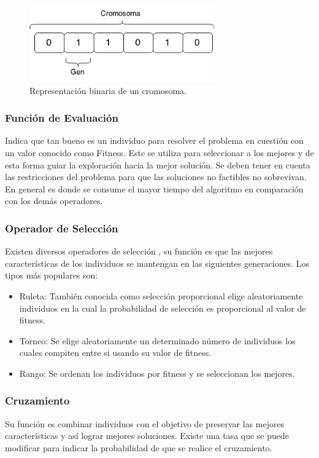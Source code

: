 \begin{figure}[H]
	\centering
	\includegraphics[width=8cm]{Figures/rep_binaria}
	\caption{Representación binaria de un cromosoma.}
	\label{fig:rep_binaria}
\end{figure}


\subsubsection{Función de Evaluación} 
Indica que tan bueno es un individuo para resolver el problema en cuestión con un valor conocido como Fitness. Este se utiliza para seleccionar a los mejores y de esta forma guiar la exploración hacia la mejor solución.
Se deben tener en cuenta las restricciones del problema para que las soluciones no factibles no sobrevivan.
En general es donde se consume el mayor tiempo del algoritmo en comparación con los demás operadores.

\subsubsection{Operador de Selección}
Existen diversos operadores de selección , su función es que las mejores características de los individuos se mantengan en las siguientes generaciones.
Los tipos más populares son:

\begin{itemize}
	\item Ruleta: También conocida como selección proporcional elige aleatoriamente individuos en la cual la probabilidad de selección es proporcional al valor de fitness.
	\item Torneo: Se elige aleatoriamente un determinado número de individuos los cuales compiten entre si usando su valor de fitness.
	\item Rango: Se ordenan los individuos por fitness y se seleccionan los mejores.
\end{itemize}

\subsubsection{Cruzamiento}
Su función es combinar individuos con el objetivo de preservar las mejores características y así lograr mejores soluciones. 
Existe una tasa que se puede modificar para indicar la probabilidad de que se realice el cruzamiento.

